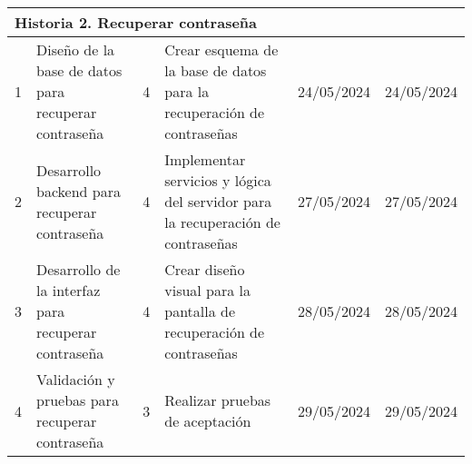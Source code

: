 \begin{longtable}{|p{0.5cm}|p{2cm}|p{1cm}|p{3cm}|p{1cm}|p{1cm}|}
    \multicolumn{6}{|l|}{\textbf{Historia 2. Recuperar contraseña}}                                                                                                                                                                                                                                                                                                                          \\ \hline
    1                                        & Diseño de la base de datos para recuperar contraseña & 4                                                              & Crear esquema de la base de datos para la recuperación de contraseñas           & 24/05/2024                                                    & 24/05/2024                                                          \\ \hline
    2                                        & Desarrollo backend para recuperar contraseña         & 4                                                              & Implementar servicios y lógica del servidor para la recuperación de contraseñas & 27/05/2024                                                    & 27/05/2024                                                          \\ \hline
    3                                        & Desarrollo de la interfaz para recuperar contraseña  & 4                                                              & Crear diseño visual para la pantalla de recuperación de contraseñas             & 28/05/2024                                                    & 28/05/2024                                                          \\ \hline
    4                                        & Validación y pruebas para recuperar contraseña       & 3                                                              & Realizar pruebas de aceptación                                                  & 29/05/2024                                                    & 29/05/2024                                                          \\ \hline


\end{longtable}
